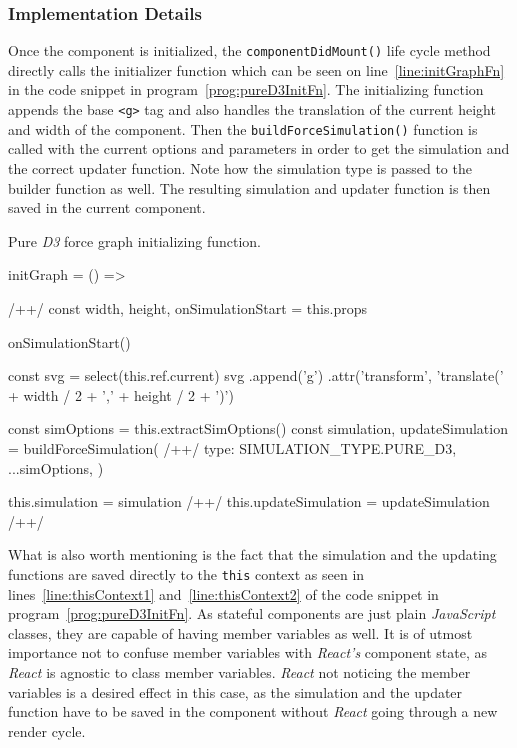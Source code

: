 \subsubsection{Implementation Details}

Once the component is initialized, the \texttt{componentDidMount()} life cycle method directly calls the initializer function which can be seen on line~\ref{line:initGraphFn} in the code snippet in program~\ref{prog:pureD3InitFn}. The initializing function appends the base \texttt{<g>} tag and also handles the translation of the current height and width of the component. Then the \texttt{build\-Force\-Simulation()} function is called with the current options and parameters in order to get the simulation and the correct updater function. Note how the simulation type is passed to the builder function as well. The resulting simulation and updater function is then saved in the current component.

\begin{program}
\caption{Pure \emph{D3} force graph initializing function.}
\label{prog:pureD3InitFn}
\begin{JsCode}
initGraph = () => { /+\label{line:initGraphFn}+/
  const { width, height, onSimulationStart } = this.props

  onSimulationStart()

  const svg = select(this.ref.current)
  svg
    .append('g')
    .attr('transform', 'translate(' + width / 2 + ',' + height / 2 + ')')

  const simOptions = this.extractSimOptions()
  const { simulation, updateSimulation } = buildForceSimulation({ /+\label{line:buildForceSimulation}+/
    type: SIMULATION_TYPE.PURE_D3,
    ...simOptions,
  })

  this.simulation = simulation /+\label{line:thisContext1}+/
  this.updateSimulation = updateSimulation /+\label{line:thisContext2}+/
}
\end{JsCode}
\end{program}

What is also worth mentioning is the fact that the simulation and the updating functions are saved directly to the \texttt{this} context as seen in lines~\ref{line:thisContext1} and~\ref{line:thisContext2} of the code snippet in program~\ref{prog:pureD3InitFn}. As stateful components are just plain \emph{JavaScript} classes, they are capable of having member variables as well. It is of utmost importance not to confuse member variables with \emph{React's} component state, as \emph{React} is agnostic to class member variables. \emph{React} not noticing the member variables is a desired effect in this case, as the simulation and the updater function have to be saved in the component without \emph{React} going through a new render cycle. 

